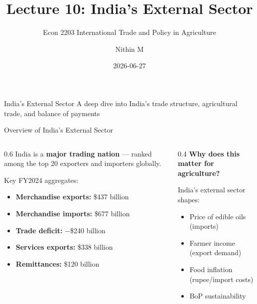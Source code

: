 \documentclass[
  ignorenonframetext,
  aspectratio=169,
]{beamer}
\title[L10 \textbar{} India's External Sector]{Lecture 10: India's
External Sector}
\subtitle{Econ 2203 \textbar{} International Trade and Policy in
Agriculture}
\author{Nithin M}
\date{2026-06-27}
\institute{Department of Development Economics}
\makeatletter
\providecommand{\tightlist}{%
  \setlength{\itemsep}{0pt}\setlength{\parskip}{0pt}}
\let\quarto@originallabel\label
\DeclareRobustCommand*{\label}[1]{\quarto@originallabel{#1}}
\makeatother
\begin{document}
\frame{\titlepage}


\begin{frame}{India's External Sector}
\label{indias-external-sector}
A deep dive into India's trade structure, agricultural trade, and
balance of payments
\end{frame}

\begin{frame}{Overview of India's External Sector}
\label{overview-of-indias-external-sector}
\begin{columns}[T]
\begin{column}{0.6\linewidth}
India is a \textbf{major trading nation} --- ranked among the top 20
exporters and importers globally.

Key FY2024 aggregates:

\begin{itemize}
\tightlist
\item
  \textbf{Merchandise exports:} \$437 billion
\item
  \textbf{Merchandise imports:} \$677 billion
\item
  \textbf{Trade deficit:} −\$240 billion
\item
  \textbf{Services exports:} \$338 billion
\item
  \textbf{Remittances:} \$120 billion
\end{itemize}
\end{column}

\begin{column}{0.4\linewidth}
\textbf{Why does this matter for agriculture?}

India's external sector shapes:

\begin{itemize}
\tightlist
\item
  Price of edible oils (imports)
\item
  Farmer income (export demand)
\item
  Food inflation (rupee/import costs)
\item
  BoP sustainability
\end{itemize}
\end{column}
\end{columns}
\end{frame}
\end{document}
